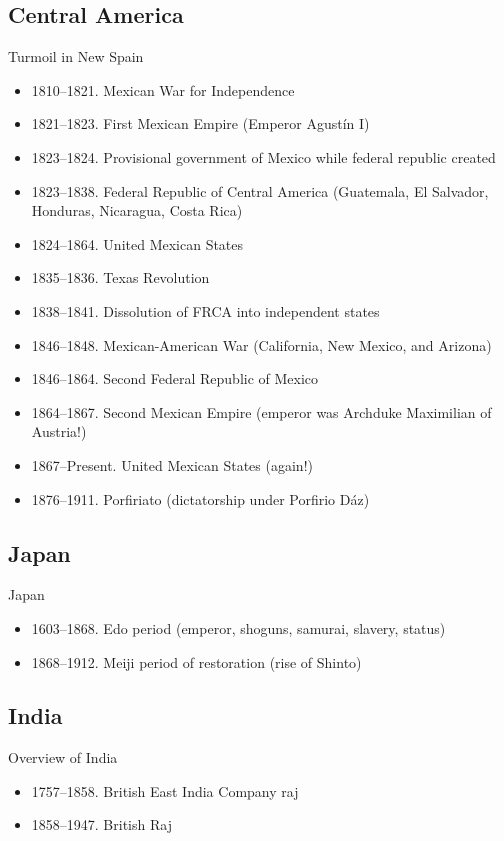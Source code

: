 \subsection{Central America}
\begin{frame}{Turmoil in New Spain}
	\begin{itemize}
		\item<1-12>1810--1821. Mexican War for Independence
		\item<2-12>1821--1823. First Mexican Empire (Emperor Agust{\'i}n I)
		\item<3-12>1823--1824. Provisional government of Mexico while federal republic created
		\item<4-12>1823--1838. Federal Republic of Central America (Guatemala, El Salvador, Honduras, Nicaragua, Costa Rica)
		\item<5-12>1824--1864. United Mexican States
		\item<6-12>1835--1836. Texas Revolution
		\item<7-12>1838--1841. Dissolution of FRCA into independent states
		\item<8-12>1846--1848. Mexican-American War (California, New Mexico, and Arizona)
		\item<9-12>1846--1864. Second Federal Republic of Mexico
		\item<10-12>1864--1867. Second Mexican Empire (emperor was Archduke Maximilian of Austria!)
		\item<11-12>1867--Present. United Mexican States (again!)
		\item<12>1876--1911. Porfiriato (dictatorship under Porfirio D{\'az})
	\end{itemize}
\end{frame}

\subsection{Japan}
\begin{frame}{Japan}
	\begin{itemize}
		\item<5,7>1603--1868. Edo period (emperor, shoguns, samurai, slavery, status)
		\item<7>1868--1912. Meiji period of restoration (rise of Shinto)
	\end{itemize}
\end{frame}

\subsection{India}
\begin{frame}{Overview of India}
	\begin{itemize}
		\item<9-10,12->1757--1858. British East India Company raj
		\item<12->1858--1947. British Raj
	\end{itemize}
\end{frame}

